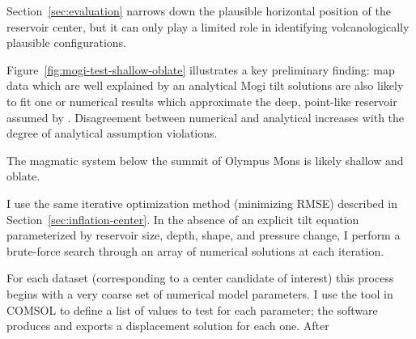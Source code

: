Section~\ref{sec:evaluation} narrows down the plausible horizontal position of the reservoir center, but it can only play a limited role in identifying volcanologically plausible configurations.

Figure~\ref{fig:mogi-test-shallow-oblate} illustrates a key preliminary finding: map data which are well explained by an analytical Mogi tilt solutions are also likely to fit one or numerical results which approximate the deep, point-like reservoir assumed by \textcite{mogi_relations_1958}. Disagreement between numerical and analytical increases with the degree of analytical assumption violations.

The magmatic system below the summit of Olympus Mons is likely shallow and oblate. 

I use the same iterative optimization method (minimizing \acs{RMSE}) described in Section~\ref{sec:inflation-center}. In the absence of an explicit tilt equation parameterized by reservoir size, depth, shape, and pressure change, I perform a brute-force search through an array of numerical solutions at each iteration.

For each dataset (corresponding to a center candidate of interest) this process begins with a very coarse set of numerical model parameters. I use the  tool in COMSOL to define a list of values to test for each parameter; the software produces and exports a displacement solution for each one. After